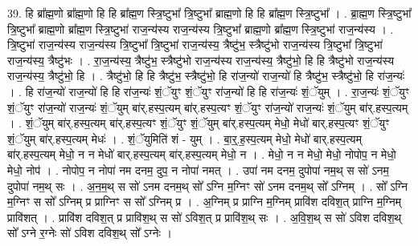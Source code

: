 \documentclass[17pt]{extarticle}
\begin{document}
39. हि ब्रा᳚ह्म॒णो ब्रा᳚ह्म॒णो हि हि ब्रा᳚ह्म॒ण स्त्रि॒ष्टुभा᳚ त्रि॒ष्टुभा᳚ ब्राह्म॒णो हि हि ब्रा᳚ह्म॒ण स्त्रि॒ष्टुभा᳚ । . ब्रा॒ह्म॒ण स्त्रि॒ष्टुभा᳚ त्रि॒ष्टुभा᳚ ब्राह्म॒णो ब्रा᳚ह्म॒ण स्त्रि॒ष्टुभा॑ राज॒न्य॑स्य राज॒न्य॑स्य त्रि॒ष्टुभा᳚ ब्राह्म॒णो ब्रा᳚ह्म॒ण स्त्रि॒ष्टुभा॑ राज॒न्य॑स्य । . त्रि॒ष्टुभा॑ राज॒न्य॑स्य राज॒न्य॑स्य त्रि॒ष्टुभा᳚ त्रि॒ष्टुभा॑ राज॒न्य॑स्य॒ त्रैष्टु॑भ॒ स्त्रैष्टु॑भो राज॒न्य॑स्य त्रि॒ष्टुभा᳚ त्रि॒ष्टुभा॑ राज॒न्य॑स्य॒ त्रैष्टु॑भः । . रा॒ज॒न्य॑स्य॒ त्रैष्टु॑भ॒ स्त्रैष्टु॑भो राज॒न्य॑स्य राज॒न्य॑स्य॒ त्रैष्टु॑भो॒ हि हि त्रैष्टु॑भो राज॒न्य॑स्य राज॒न्य॑स्य॒ त्रैष्टु॑भो॒ हि । . त्रैष्टु॑भो॒ हि हि त्रैष्टु॑भ॒ स्त्रैष्टु॑भो॒ हि रा॑ज॒न्यो॑ राज॒न्यो॑ हि त्रैष्टु॑भ॒ स्त्रैष्टु॑भो॒ हि रा॑ज॒न्यः॑ । . हि रा॑ज॒न्यो॑ राज॒न्यो॑ हि हि रा॑ज॒न्यः॑ शं॒ॅयुꣳ शं॒ॅयुꣳ रा॑ज॒न्यो॑ हि हि रा॑ज॒न्यः॑ शं॒ॅयुम् । . रा॒ज॒न्यः॑ शं॒ॅयुꣳ शं॒ॅयुꣳ रा॑ज॒न्यो॑ राज॒न्यः॑ शं॒ॅयुम् बा॑र्.हस्प॒त्यम् बा॑र्.हस्प॒त्यꣳ शं॒ॅयुꣳ रा॑ज॒न्यो॑ राज॒न्यः॑ शं॒ॅयुम् बा॑र्.हस्प॒त्यम् । . शं॒ॅयुम् बा॑र्.हस्प॒त्यम् बा॑र्.हस्प॒त्यꣳ शं॒ॅयुꣳ शं॒ॅयुम् बा॑र्.हस्प॒त्यम् मेधो॒ मेधो॑ बार्.हस्प॒त्यꣳ शं॒ॅयुꣳ शं॒ॅयुम् बा॑र्.हस्प॒त्यम् मेधः॑ । . शं॒ॅयुमिति॑ शं - युम् । . बा॒र्॒.ह॒स्प॒त्यम् मेधो॒ मेधो॑ बार्.हस्प॒त्यम् बा॑र्.हस्प॒त्यम् मेधो॒ न न मेधो॑ बार्.हस्प॒त्यम् बा॑र्.हस्प॒त्यम् मेधो॒ न । . मेधो॒ न न मेधो॒ मेधो॒ नोपोप॒ न मेधो॒ मेधो॒ नोप॑ । . नोपोप॒ न नोपा॑ नम दनम॒ दुप॒ न नोपा॑ नमत् । . उपा॑ नम दनम॒ दुपोपा॑ नम॒थ् स सो॑ ऽनम॒ दुपोपा॑ नम॒थ् सः । . अ॒न॒म॒थ् स सो॑ ऽनम दनम॒थ् सो᳚ ऽग्नि म॒ग्निꣳ सो॑ ऽनम दनम॒थ् सो᳚ ऽग्निम् । . सो᳚ ऽग्नि म॒ग्निꣳ स सो᳚ ऽग्निम् प्र प्राग्निꣳ स सो᳚ ऽग्निम् प्र । . अ॒ग्निम् प्र प्राग्नि म॒ग्निम् प्रावि॑श दविश॒त् प्राग्नि म॒ग्निम् प्रावि॑शत् । . प्रावि॑श दविश॒त् प्र प्रावि॑श॒थ् स सो॑ ऽविश॒त् प्र प्रावि॑श॒थ् सः । . अ॒वि॒श॒थ् स सो॑ ऽविश दविश॒थ् सो᳚ ऽग्ने र॒ग्नेः सो॑ ऽविश दविश॒थ् सो᳚ ऽग्नेः । \newline
\pagebreak
{}
\end{document}
